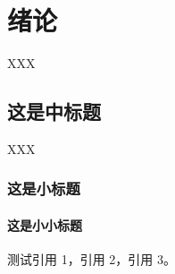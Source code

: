 
\chapter{绪论}
XXX
\section{这是中标题}
XXX
\subsection{这是小标题}
\subsubsection{这是小小标题}
测试引用 1\cite{周融2003}，引用 2\cite{图书馆,李大伦1998,伍蠡甫,张筑生}，引用 3\cite{冯西桥1998,姜锡洲,gbt7714_2006,科学技术期刊管理办法,中国大学学报论文文摘,DUBAR2013--,FOURNEY}。


